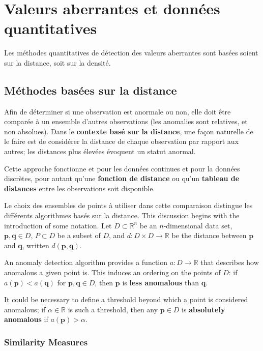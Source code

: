 \newpage
\section{Valeurs aberrantes et donn\'ees quantitatives}\label{Section:2}
Les méthodes quantitatives de d\'etection des valeurs aberrantes sont bas\'ees soient sur la distance, soit sur la densité. 
\subsection{Méthodes basées sur la distance}
Afin de déterminer si une observation est anormale ou non, elle doit être comparée à un ensemble d'autres observations (les anomalies sont relatives, et non absolues). Dans le \textbf{contexte basé sur la distance}, une façon naturelle de le faire est de considérer la distance de chaque observation par rapport aux autres; les distances plus \'elev\'ees évoquent un statut anormal.

Cette approche fonctionne et pour les donn\'ees continues et pour la donn\'ees discr\`etes, pour autant qu'une \textbf{fonction de distance} ou qu'un \textbf{tableau de distances} entre les observations soit disponible. 

Le choix des ensembles de points à utiliser dans cette comparaison distingue les différents algorithmes basés sur la distance.
\newl This discussion begins with the introduction of some notation.
Let $D \subset \mathbb{R}^n$ be an $n$-dimensional data set, 
$\mathbf{p},\mathbf{q}\in D$, 
$P \subset D$ be a subset of $D$, 
and $d: D \times D \to \mathbb{R}$ be the distance between $\mathbf{p}$ and $\mathbf{q}$, written $d(\mathbf{p},\mathbf{q})$.

An anomaly detection algorithm provides a function $a : D \to \mathbb{R}$ that describes how anomalous a given point is. This induces an ordering on the points of $D$: 
if $a(\mathbf{p}) < a(\mathbf{q})$ for $\mathbf{p},\mathbf{q} \in D$, then $\mathbf{p}$ is \textbf{less anomalous} than $\mathbf{q}$.

It could be necessary to define a threshold beyond which a point is considered anomalous; if $\alpha \in \mathbb{R}$ is such a threshold, then any $\mathbf{p} \in D$ is \textbf{absolutely anomalous} if  $a(\mathbf{p}) > \alpha$.

\subsubsection*{Similarity Measures}

